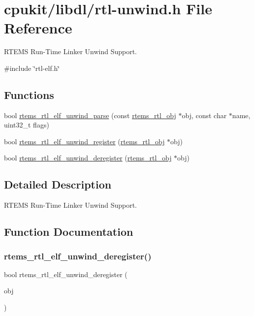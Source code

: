 \hypertarget{rtl-unwind_8h}{}\section{cpukit/libdl/rtl-\/unwind.h File Reference}
\label{rtl-unwind_8h}


R\+T\+E\+MS Run-\/\+Time Linker Unwind Support.  


{\ttfamily \#include \char`\"{}rtl-\/elf.\+h\char`\"{}}\newline
\subsection*{Functions}
\begin{DoxyCompactItemize}
\item 
bool \mbox{\hyperlink{rtl-unwind_8h_ab43fb2d68998f048abff9ffadc22e231}{rtems\+\_\+rtl\+\_\+elf\+\_\+unwind\+\_\+parse}} (const \mbox{\hyperlink{structrtems__rtl__obj}{rtems\+\_\+rtl\+\_\+obj}} $\ast$obj, const char $\ast$name, uint32\+\_\+t flags)
\item 
bool \mbox{\hyperlink{rtl-unwind_8h_adc0e47addca6d6f072216fc161452adc}{rtems\+\_\+rtl\+\_\+elf\+\_\+unwind\+\_\+register}} (\mbox{\hyperlink{structrtems__rtl__obj}{rtems\+\_\+rtl\+\_\+obj}} $\ast$obj)
\item 
bool \mbox{\hyperlink{rtl-unwind_8h_afa3a0873c27f0ddcc4a34e4f9f1d1380}{rtems\+\_\+rtl\+\_\+elf\+\_\+unwind\+\_\+deregister}} (\mbox{\hyperlink{structrtems__rtl__obj}{rtems\+\_\+rtl\+\_\+obj}} $\ast$obj)
\end{DoxyCompactItemize}


\subsection{Detailed Description}
R\+T\+E\+MS Run-\/\+Time Linker Unwind Support. 



\subsection{Function Documentation}
\mbox{\label{rtl-unwind_8h_afa3a0873c27f0ddcc4a34e4f9f1d1380}} 
\subsubsection{\texorpdfstring{rtems\_rtl\_elf\_unwind\_deregister()}{rtems\_rtl\_elf\_unwind\_deregister()}}
{\footnotesize\ttfamily bool rtems\+\_\+rtl\+\_\+elf\+\_\+unwind\+\_\+deregister (\begin{DoxyParamCaption}\item[{\mbox{\hyperlink{structrtems__rtl__obj}{rtems\+\_\+rtl\+\_\+obj}} $\ast$}]{obj }\end{DoxyParamCaption})}

